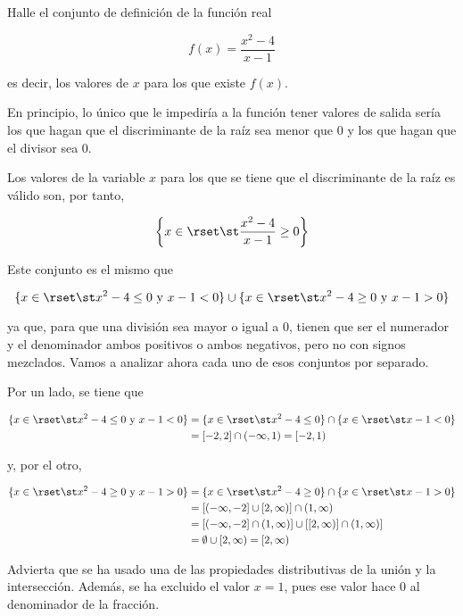 \begin{exercise}
  Halle el conjunto de definición de la función real

  \[ f(x) = \frac{x^2 - 4}{x - 1} \]

  \noindent es decir, los valores de $x$ para los que existe $f(x)$.

  En principio, lo único que le impediría a la función tener valores de
  salida sería los que hagan que el discriminante de la raíz sea menor que 0
  y los que hagan que el divisor sea 0.

  Los valores de la variable $x$ para los que se tiene que el discriminante
  de la raíz es válido son, por tanto,

  \[ \left\{ x \in \rset \st \frac{x^2 - 4}{x - 1} \geq 0 \right\} \]

  \noindent Este conjunto es el mismo que

  \[ \{x \in \rset \st x^2 - 4 \leq 0 \ \text{y} \ x - 1 < 0\} \cup \{x \in
  \rset \st x^2 - 4 \geq 0 \ \text{y} \ x - 1 > 0\} \]

  \noindent ya que, para que una división sea mayor o igual a 0, tienen que
  ser el numerador y el denominador ambos positivos o ambos negativos, pero
  no con signos mezclados. Vamos a analizar ahora cada uno de esos conjuntos
  por separado.

  Por un lado, se tiene que

  \begin{align*}
    \{x \in \rset \st x^2 - 4 \leq 0 \ \text{y} \ x - 1 < 0\}
      &= \{x \in \rset \st x^2 - 4 \leq 0\}
      \cap \{x \in \rset \st x - 1 < 0\} \\
      &= [{-2}, 2] \cap ({-\infty}, 1) = [{-2}, 1)
  \end{align*}

  \noindent y, por el otro,

  \begin{align*}
    \{x \in \rset \st x^2 - 4 \geq 0 \ \text{y} \ x - 1 > 0\}
      &= \{x \in \rset \st x^2 - 4 \geq 0\}
      \cap \{x \in \rset \st x - 1 > 0\} \\
      &= [({-\infty}, {-2}] \cup [2, \infty)] \cap (1, \infty) \\
      &= [({-\infty}, {-2}] \cap (1, \infty)] \cup [[2, \infty)] \cap (1,
        \infty)] \\
      &= \emptyset \cup [2, \infty) = [2, \infty) \\
  \end{align*}

  \noindent Advierta que se ha usado una de las propiedades distributivas de
  la unión y la intersección. Además, se ha excluido el valor $x = 1$, pues
  ese valor hace 0 al denominador de la fracción.


\end{exercise}
